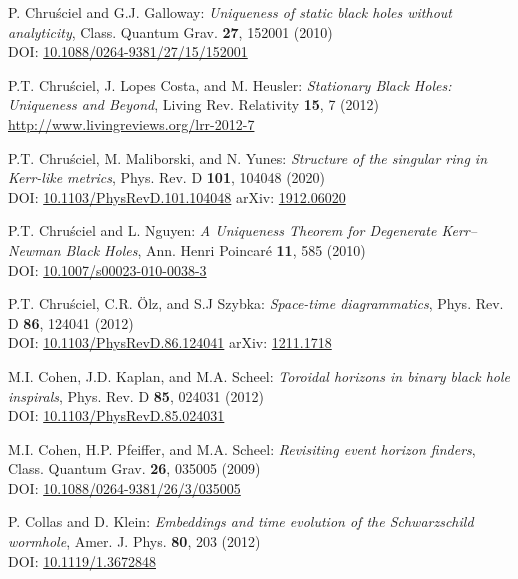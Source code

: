 \begin{thebibliography}{123}
P. Chru\'sciel and G.J. Galloway:
{\em Uniqueness of static black holes without analyticity},
Class. Quantum Grav. {\bf 27}, 152001 (2010)\\
DOI: \href{https://doi.org/10.1088/0264-9381/27/15/152001}{10.1088/0264-9381/27/15/152001}

P.T. Chru\'sciel, J. Lopes Costa, and M. Heusler:
{\em Stationary Black Holes: Uniqueness and Beyond},
Living Rev. Relativity {\bf 15}, 7 (2012) \\
\url{http://www.livingreviews.org/lrr-2012-7}

P.T. Chru\'sciel, M. Maliborski, and N. Yunes:
{\em Structure of the singular ring in Kerr-like metrics},
Phys. Rev. D {\bf 101}, 104048 (2020)\\
DOI: \href{https://doi.org/10.1103/PhysRevD.101.104048}{10.1103/PhysRevD.101.104048}\hfill
arXiv: \href{https://arxiv.org/abs/1912.06020}{1912.06020}

P.T. Chru\'sciel and L. Nguyen:
{\em A Uniqueness Theorem for Degenerate Kerr–Newman Black Holes},
Ann. Henri Poincar\'e {\bf 11}, 585 (2010)\\
DOI: \href{https://doi.org/10.1007/s00023-010-0038-3}{10.1007/s00023-010-0038-3}

P.T. Chru\'sciel, C.R. Ölz, and S.J Szybka:
{\em Space-time diagrammatics},
Phys. Rev. D {\bf 86}, 124041 (2012)\\
DOI:  \href{https://doi.org/10.1103/PhysRevD.86.124041}{10.1103/PhysRevD.86.124041}\hfill
arXiv: \href{https://arxiv.org/abs/1211.1718}{1211.1718}

M.I. Cohen, J.D. Kaplan, and M.A. Scheel:
{\em Toroidal horizons in binary black hole inspirals},
Phys. Rev. D {\bf 85}, 024031 (2012)\\
DOI:  \href{https://doi.org/10.1103/PhysRevD.85.024031}{10.1103/PhysRevD.85.024031}

M.I. Cohen, H.P. Pfeiffer, and M.A. Scheel:
{\em Revisiting event horizon finders},
Class. Quantum Grav. {\bf 26}, 035005 (2009)\\
DOI: \href{https://doi.org/10.1088/0264-9381/26/3/035005}{10.1088/0264-9381/26/3/035005}

P. Collas and D. Klein:
{\em Embeddings and time evolution of the Schwarzschild wormhole},
Amer. J. Phys. {\bf 80}, 203 (2012)\\
DOI: \href{https://doi.org/10.1119/1.3672848}{10.1119/1.3672848}


\end{thebibliography}
